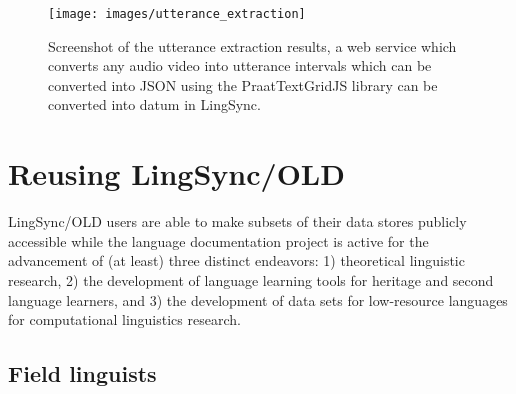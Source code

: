 \documentclass[11pt]{article}
\newcommand{\smalltodo}[2][]
    {\todo[caption={#2}, #1]
    {\tiny#2\normalsize}}
\begin{document}
\begin{figure}
\begin{center}
\texttt{[image: images/utterance\_extraction]}
\caption{Screenshot of the utterance extraction results, a web service which converts any audio video into utterance intervals which can be converted into JSON using the PraatTextGridJS library can be converted into datum in LingSync.}
\label{utterance_extraction_screenshot}
\end{center}
\end{figure}


\section{Reusing LingSync/OLD}
\label{open-data}

LingSync/OLD users are able to make subsets of their data stores publicly
accessible while the language documentation project is active for the advancement of (at least) three distinct endeavors: 1)
theoretical linguistic research, 2) the development of language learning tools for
heritage and second language learners, and 3) the development of data sets for low-resource languages for computational linguistics research. 



\subsection{Field linguists}
\end{document}
